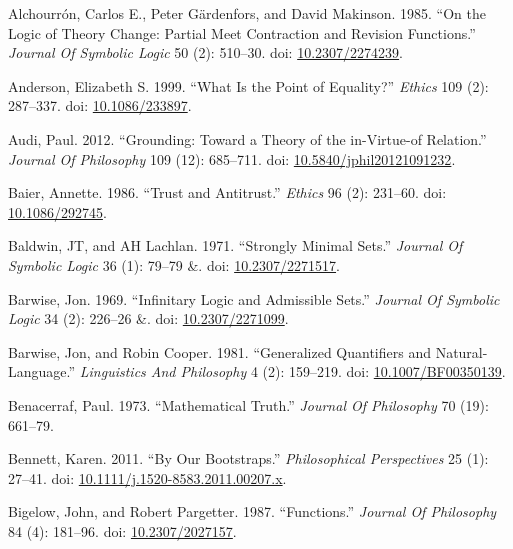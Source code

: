 \documentclass[
  10pt,
  letterpaper,
  DIV=11,
  numbers=noendperiod,
  twoside]{scrartcl}
\newlength{\cslhangindent}
\newenvironment{CSLReferences}[2] %
 {\begin{list}{}{%
  \setlength{\itemindent}{0pt}
  \setlength{\leftmargin}{0pt}
  \setlength{\parsep}{0pt}
  \ifodd #1
   \setlength{\leftmargin}{\cslhangindent}
   \setlength{\itemindent}{-1\cslhangindent}
  \fi
  \setlength{\itemsep}{#2\baselineskip}}}
 {\end{list}}
\begin{document}
\label{refs}
\begin{CSLReferences}{1}{0}
Alchourrón, Carlos E., Peter Gärdenfors, and David Makinson. 1985. {``On
the Logic of Theory Change: Partial Meet Contraction and Revision
Functions.''} \emph{Journal Of Symbolic Logic} 50 (2): 510--30. doi:
\href{https://doi.org/10.2307/2274239}{10.2307/2274239}.

Anderson, Elizabeth S. 1999. {``What Is the Point of Equality?''}
\emph{Ethics} 109 (2): 287--337. doi:
\href{https://doi.org/10.1086/233897}{10.1086/233897}.

Audi, Paul. 2012. {``Grounding: Toward a Theory of the in-Virtue-of
Relation.''} \emph{Journal Of Philosophy} 109 (12): 685--711. doi:
\href{https://doi.org/10.5840/jphil20121091232}{10.5840/jphil20121091232}.

Baier, Annette. 1986. {``Trust and Antitrust.''} \emph{Ethics} 96 (2):
231--60. doi: \href{https://doi.org/10.1086/292745}{10.1086/292745}.

Baldwin, JT, and AH Lachlan. 1971. {``Strongly Minimal Sets.''}
\emph{Journal Of Symbolic Logic} 36 (1): 79--79 \&. doi:
\href{https://doi.org/10.2307/2271517}{10.2307/2271517}.

Barwise, Jon. 1969. {``Infinitary Logic and Admissible Sets.''}
\emph{Journal Of Symbolic Logic} 34 (2): 226--26 \&. doi:
\href{https://doi.org/10.2307/2271099}{10.2307/2271099}.

Barwise, Jon, and Robin Cooper. 1981. {``Generalized Quantifiers and
Natural-Language.''} \emph{Linguistics And Philosophy} 4 (2): 159--219.
doi: \href{https://doi.org/10.1007/BF00350139}{10.1007/BF00350139}.

Benacerraf, Paul. 1973. {``Mathematical Truth.''} \emph{Journal Of
Philosophy} 70 (19): 661--79.

Bennett, Karen. 2011. {``By Our Bootstraps.''} \emph{Philosophical
Perspectives} 25 (1): 27--41. doi:
\href{https://doi.org/10.1111/j.1520-8583.2011.00207.x}{10.1111/j.1520-8583.2011.00207.x}.

Bigelow, John, and Robert Pargetter. 1987. {``Functions.''}
\emph{Journal Of Philosophy} 84 (4): 181--96. doi:
\href{https://doi.org/10.2307/2027157}{10.2307/2027157}.


\end{CSLReferences}
\end{document}
